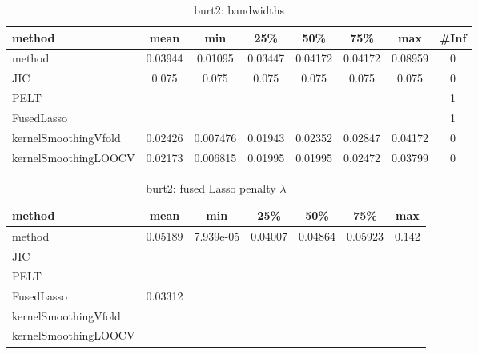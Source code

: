 \begin{table}[ht]
\centering
\begin{tabular}{l|c|ccccc|c}
  \hline
method & mean & min & 25\% & 50\% & 75\% & max & \#Inf \\ 
  \hline
method & 0.03944 & 0.01095 & 0.03447 & 0.04172 & 0.04172 & 0.08959 &   0 \\ 
  JIC & 0.075 & 0.075 & 0.075 & 0.075 & 0.075 & 0.075 &   0 \\ 
  PELT &  &  &  &  &  &  &   1 \\ 
  FusedLasso &  &  &  &  &  &  &   1 \\ 
  kernelSmoothingVfold & 0.02426 & 0.007476 & 0.01943 & 0.02352 & 0.02847 & 0.04172 &   0 \\ 
  kernelSmoothingLOOCV & 0.02173 & 0.006815 & 0.01995 & 0.01995 & 0.02472 & 0.03799 &   0 \\ 
   \hline
\end{tabular}
\caption{burt2: bandwidths} 
\label{tab:burt2Bandwidths}
\end{table}
\begin{table}[ht]
\centering
\begin{tabular}{l|c|ccccc}
  \hline
method & mean & min & 25\% & 50\% & 75\% & max \\ 
  \hline
method & 0.05189 & 7.939e-05 & 0.04007 & 0.04864 & 0.05923 & 0.142 \\ 
  JIC &  &  &  &  &  &  \\ 
  PELT &  &  &  &  &  &  \\ 
  FusedLasso & 0.03312 &  &  &  &  &  \\ 
  kernelSmoothingVfold &  &  &  &  &  &  \\ 
  kernelSmoothingLOOCV &  &  &  &  &  &  \\ 
   \hline
\end{tabular}
\caption{burt2: fused Lasso penalty $\lambda$} 
\label{tab:burt2Lambdas}
\end{table}
